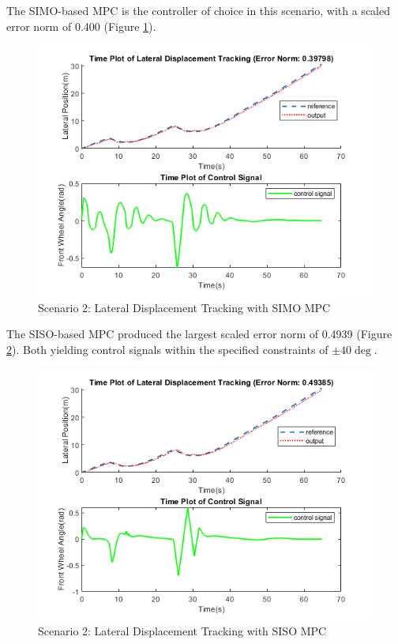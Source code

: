 \documentclass[a4paper, twocolumn]{article}
\begin{document}
The SIMO-based MPC is the controller of choice in this scenario, with a scaled error norm of 0.400 (Figure \ref{fig:scen_2_mpc2_lat}). 

\begin{figure}
    \centering
    \includegraphics[scale=0.40]{img/scenario_2/mpc2-lateral_tracking.png}
    \caption{Scenario 2: Lateral Displacement Tracking with SIMO MPC}
    \label{fig:scen_2_mpc2_lat}
\end{figure}

The SISO-based MPC produced the largest scaled error norm of 0.4939 (Figure \ref{fig:scen_2_mpc1_lat}). 
Both yielding control signals within the specified constraints of $\pm40\deg$. 

\begin{figure}
    \centering
    \includegraphics[scale=0.40]{img/scenario_2/mpc1-lateral_tracking.png}
    \caption{Scenario 2: Lateral Displacement Tracking with SISO MPC}
    \label{fig:scen_2_mpc1_lat}
\end{figure}
\end{document}
